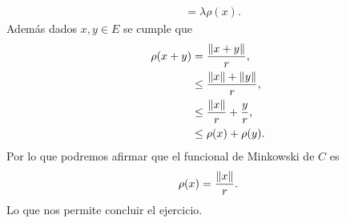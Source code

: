 \begin{homeworkProblem}
\begin{solution}
\begin{align*}
      &=\lambda \rho(x).
    \end{align*}
    Además dados $x,y\in E$ se cumple que
    \begin{align*}
      \rho(x+y)&=\frac{\left\|x+y\right\|}{r},\\
      &\leq \frac{\left\|x\right\|+\left\|y\right\|}{r},\\
      &\leq \frac{\left\|x\right\|}{r}+\frac{y}{r},\\
      &\leq \rho(x)+\rho(y).
    \end{align*}
    Por lo que podremos afirmar que el funcional de Minkowski de $C$ es
    \begin{align*}
      \rho(x)=\frac{\left\|x\right\|}{r}.
    \end{align*}
    Lo que nos permite concluir el ejercicio.
  \end{solution}
\end{homeworkProblem}
